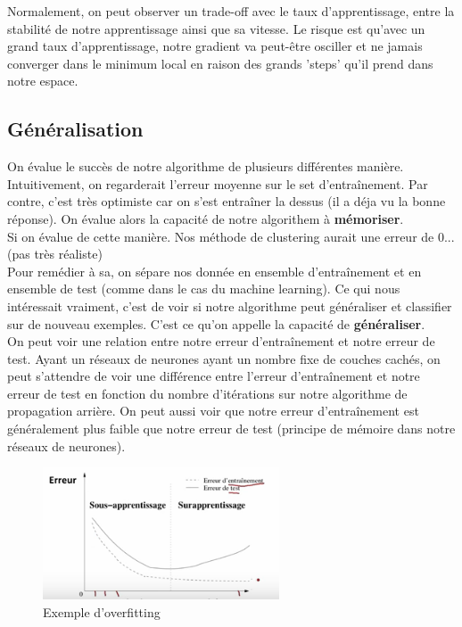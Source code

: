 \documentclass[oneside]{book}
\begin{document}
Normalement, on peut observer un trade-off avec le taux d'apprentissage, entre la stabilité de notre apprentissage ainsi que sa vitesse. Le risque est qu'avec un grand taux d'apprentissage, notre gradient va peut-être osciller et ne jamais converger dans le minimum local en raison des grands 'steps' qu'il prend dans notre espace.

\subsection{Généralisation}
On évalue le succès de notre algorithme de plusieurs différentes manière. Intuitivement, on regarderait l'erreur moyenne sur le set d'entraînement. Par contre, c'est très optimiste car on s'est entraîner la dessus (il a déja vu la bonne réponse). On évalue alors la capacité de notre algorithem à \textbf{mémoriser}. \\

Si on évalue de cette manière. Nos méthode de clustering aurait une erreur de 0... (pas très réaliste)\\

Pour remédier à sa, on sépare nos donnée en ensemble d'entraînement et en ensemble de test (comme dans le cas du machine learning).  Ce qui nous intéressait vraiment, c'est de voir si notre algorithme peut généraliser et classifier sur de nouveau exemples. C'est ce qu'on appelle la capacité de \textbf{généraliser}.\\

On peut voir une relation entre notre erreur d'entraînement et notre erreur de test. Ayant un réseaux de neurones ayant un nombre fixe de couches cachés, on peut s'attendre de voir une différence entre l'erreur d'entraînement et notre erreur de test en fonction du nombre d'itérations sur notre algorithme de propagation arrière. On peut aussi voir que notre erreur d'entraînement est généralement plus faible que notre erreur de test (principe de mémoire dans notre réseaux de neurones).\\

\begin{figure}[!ht]

\centering
\includegraphics[width = 7cm]{overfitting.png}
\caption{Exemple d'overfitting}
\label{fig:overfitting}

\end{figure}
\end{document}
